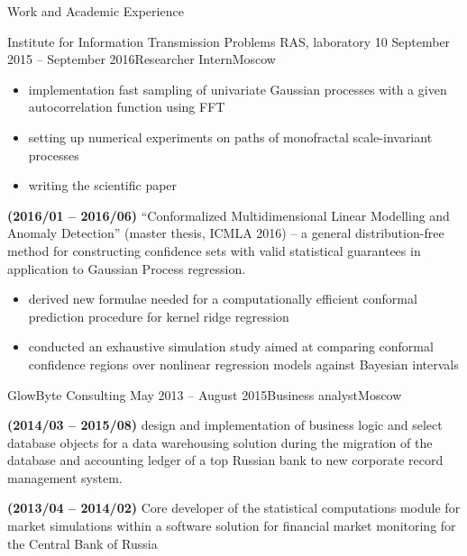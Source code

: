 \documentclass{resume} %
\begin{document}
\begin{rSection}{Work and Academic Experience}
\begin{rSubsection}{
        Institute for Information Transmission Problems RAS, laboratory 10
    }{September 2015 -- September 2016}{Researcher Intern}{Moscow}
\begin{itemize}
        \item implementation fast sampling of univariate Gaussian processes with a given autocorrelation function using FFT

        \item setting up numerical experiments on paths of monofractal scale-invariant processes

        \item writing the scientific paper
    \end{itemize}

    \item \textbf{(2016/01 -- 2016/06)}
    ``Conformalized Multidimensional Linear Modelling and Anomaly Detection'' (master thesis, ICMLA 2016) -- a general distribution-free method for constructing confidence sets with valid statistical guarantees in application to Gaussian Process regression.
    \begin{itemize}
        \item derived new formulae needed for a computationally efficient conformal prediction procedure for kernel ridge regression

        \item conducted an exhaustive simulation study aimed at comparing conformal confidence regions over nonlinear regression models against Bayesian intervals

    \end{itemize}
\end{rSubsection}

\begin{rSubsection}{
        GlowByte Consulting
    }{May 2013 -- August 2015}{Business analyst}{Moscow}
    \item \textbf{(2014/03 -- 2015/08)}
    design and implementation of business logic and select database objects for a data warehousing solution during the migration of the database and accounting ledger of a top Russian bank to new corporate record management system.

    \item \textbf{(2013/04 -- 2014/02)}
    Core developer of the statistical computations module for market simulations within a software solution for financial market monitoring for the Central Bank of Russia
\end{rSubsection}


\end{rSection}
\end{document}
